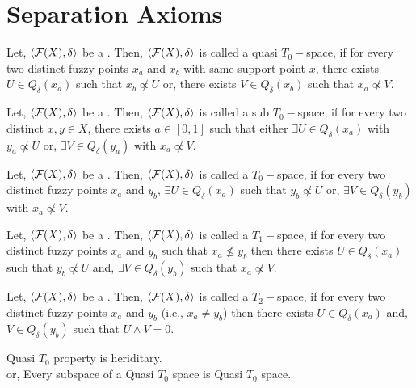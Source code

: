 \documentclass[../main-sheet.tex]{subfiles}
\begin{document}
\chapter{Separation Axioms}
\begin{defn}
    Let, \(\langle \mathcal{F}(X), \delta \rangle\) be a \fts. Then, \(\langle \mathcal{F}(X), \delta \rangle\) is called a quasi \(T_0-\)space, if for every two distinct fuzzy points \(x_a\) and \(x_b\) with same support point \(x\), there exists \(U\in Q_\delta(x_a)\) such that \(x_b \not\propto U\) or, there exists \(V\in Q_\delta(x_b)\) such that \(x_a \not\propto V\).
\end{defn}
\begin{defn}
    Let, \(\langle \mathcal{F}(X), \delta \rangle\) be a \fts. Then, \(\langle \mathcal{F}(X), \delta \rangle\) is called a sub \(T_0-\)space, if for every two distinct \(x, y \in X\), there exists \(a\in [0,1]\) such that either \(\exists U\in Q_\delta(x_a)\) with \(y_a \not\propto U\) or, \(\exists V\in Q_\delta(y_a)\) with \(x_a \not\propto V\).
\end{defn}
\begin{defn}[\(T_0-\)space]
    Let, \(\langle \mathcal{F}(X), \delta \rangle\) be a \fts. Then, \(\langle \mathcal{F}(X), \delta \rangle\) is called a \(T_0-\)space, if for every two distinct fuzzy points \(x_a\) and \( y_b\),  \(\exists U\in Q_\delta(x_a)\) such that \(y_b \not\propto U\) or, \(\exists V\in Q_\delta(y_b)\) with \(x_a \not\propto V\).
\end{defn}
\begin{defn}[\(T_1-\)space]
    Let, \(\langle \mathcal{F}(X), \delta \rangle\) be a \fts. Then, \(\langle \mathcal{F}(X), \delta \rangle\) is called a \(T_1-\)space, if for every two distinct fuzzy points \(x_a\) and \(y_b\) such that \(x_a\not\leq y_b\) then there exists \(U\in Q_\delta(x_a)\) such that \(y_b \not\propto U\) and, \(\exists V\in Q_\delta(y_b)\) such that \(x_a \not\propto V\).
\end{defn}
\begin{defn}[\(T_2-\)space]
    Let, \(\langle \mathcal{F}(X), \delta \rangle\) be a \fts. Then, \(\langle \mathcal{F}(X), \delta \rangle\) is called a \(T_2-\)space, if for every two distinct fuzzy points \(x_a\) and \(y_b\) (i.e., \(x_a\neq y_b\)) then there exists \(U\in Q_\delta(x_a)\) and, \(V\in Q_\delta(y_b)\) such that \(U\wedge V=\underbar{0}\).
\end{defn}
\begin{thm}
    Quasi \(T_0\) property is heriditary.\\
    or, Every subspace of a Quasi \(T_0\) space is Quasi \(T_0\) space.
\end{thm}
\end{document}
